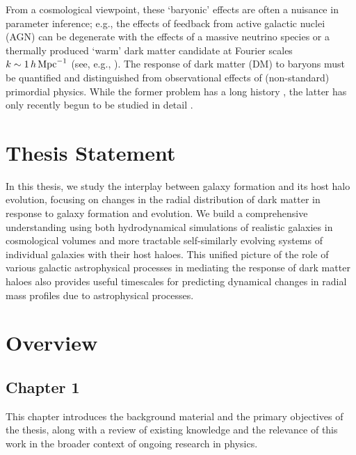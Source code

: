\documentclass[a4paper, 12pt, oneside]{Thesis}  %
\begin{document}
From a cosmological viewpoint, these `baryonic' effects are often a nuisance in parameter inference; e.g., the effects of feedback from active galactic nuclei (AGN) can be degenerate with the effects of a massive neutrino species or a thermally produced ‘warm’ dark matter candidate at Fourier scales $k\sim1\,h\,{\rm Mpc}^{-1}$ (see, e.g., \cite{2019Chisari_etal_Baryfeedback,2020AricoAnguloetal_baryonifi}). The response of dark matter (DM) to baryons must be quantified and distinguished from observational effects of (non-standard) primordial physics. While the former problem has a long history \cite{1986Blumenthal,2004Gnesin_etal,2005SellwoodMcGaugh,2006Gustafsson_FS,2010Abadi_NFBS,2010DuffySchaye_etal,2010PedrosaTissera_etal,2010TisseraWhite_etal,2019ArtalePedrosa_etal,2022ForouharMoreno_etal,2023Velmani&Paranjape}, the latter has only recently begun to be studied in detail \cite{2011TeyssierMMDM,2015SchneiderTeyssier,2015Mead_PHJH,2020AricoAnguloetal_baryonifi,2021AricoAnguloetal_baryonifi,2023EuclidCastro_etal}.

\section*{Thesis Statement}

In this thesis, we study the interplay between galaxy formation and its host halo evolution, focusing on changes in the radial distribution of dark matter in response to galaxy formation and evolution. We build a comprehensive understanding using both hydrodynamical simulations of realistic galaxies in cosmological volumes and more tractable self-similarly evolving systems of individual galaxies with their host haloes. This unified picture of the role of various galactic astrophysical processes in mediating the response of dark matter haloes also provides useful timescales for predicting dynamical changes in radial mass profiles due to astrophysical processes.

\section*{Overview}

\subsection*{Chapter 1}
This chapter introduces the background material and the primary objectives of the thesis, along with a review of existing knowledge and the relevance of this work in the broader context of ongoing research in physics.
\end{document}
